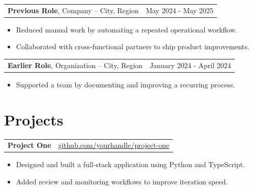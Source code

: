 \documentclass[10pt,letterpaper]{article}
\newenvironment{onecolentry}{}{}
\newenvironment{twocolentry}[1]{
    \def\rightcolumn{#1}
    \begin{tabularx}{\textwidth}{Xr}
}{
    & \rightcolumn
    \end{tabularx}
}
\begin{document}
    \vspace{0.10 cm}
    \begin{twocolentry}{May 2024 - May 2025}
        \textbf{Previous Role}, Company -- City, Region
    \end{twocolentry}

    \vspace{0.10 cm}
    \begin{onecolentry}
        \begin{itemize}[leftmargin=2em, itemsep=1pt, parsep=0pt, topsep=0pt, partopsep=0pt]
            \item Reduced manual work by automating a repeated operational workflow.
            \item Collaborated with cross-functional partners to ship product improvements.
        \end{itemize}
    \end{onecolentry}

    \vspace{0.10 cm}
    \begin{twocolentry}{January 2024 - April 2024}
        \textbf{Earlier Role}, Organization -- City, Region
    \end{twocolentry}

    \vspace{0.10 cm}
    \begin{onecolentry}
        \begin{itemize}[leftmargin=2em, itemsep=1pt, parsep=0pt, topsep=0pt, partopsep=0pt]
            \item Supported a team by documenting and improving a recurring process.
        \end{itemize}
    \end{onecolentry}

    \vspace{0.10 cm}
    \section{Projects}

    \begin{twocolentry}{\href{https://github.com/yourhandle/project-one}{github.com/yourhandle/project-one}}
        \textbf{Project One}
    \end{twocolentry}

    \vspace{0.10 cm}
    \begin{onecolentry}
        \begin{itemize}[leftmargin=2em, itemsep=1pt, parsep=0pt, topsep=0pt, partopsep=0pt]
            \item Designed and built a full-stack application using Python and TypeScript.
            \item Added review and monitoring workflows to improve iteration speed.
        \end{itemize}
    \end{onecolentry}
\end{document}
